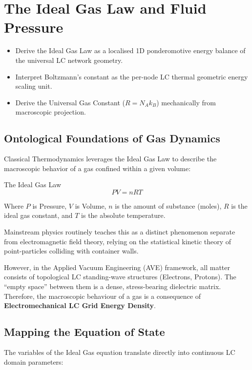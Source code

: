 \chapter{The Ideal Gas Law and Fluid Pressure}
\label{ch:ideal_gas_law}


\begin{objectivebox}
\begin{itemize}
    \item Derive the Ideal Gas Law as a localised 1D ponderomotive energy balance of the universal LC network geometry.
    \item Interpret Boltzmann's constant as the per-node LC thermal geometric energy scaling unit.
    \item Derive the Universal Gas Constant ($R = N_A k_B$) mechanically from macroscopic projection.
\end{itemize}
\end{objectivebox}

\section{Ontological Foundations of Gas Dynamics}
Classical Thermodynamics leverages the Ideal Gas Law to describe the macroscopic behavior of a gas confined within a given volume:
\begin{resultbox}{The Ideal Gas Law}
\begin{equation}
    PV = nRT
\end{equation}
\end{resultbox}
Where $P$ is Pressure, $V$ is Volume, $n$ is the amount of substance (moles), $R$ is the ideal gas constant, and $T$ is the absolute temperature.

Mainstream physics routinely teaches this as a distinct phenomenon separate from electromagnetic field theory, relying on the statistical kinetic theory of point-particles colliding with container walls. 

However, in the Applied Vacuum Engineering (AVE) framework, all matter consists of topological LC standing-wave structures (Electrons, Protons). The ``empty space'' between them is a dense, stress-bearing dielectric matrix. Therefore, the macroscopic behaviour of a gas is a consequence of \textbf{Electromechanical LC Grid Energy Density}.

\section{Mapping the Equation of State}
The variables of the Ideal Gas equation translate directly into continuous LC domain parameters:

